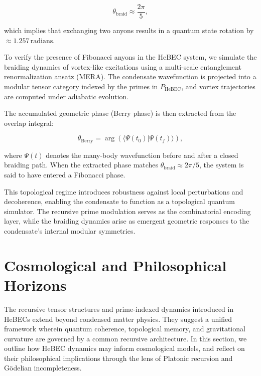 \documentclass{article}
\theoremstyle{plain}
\begin{document}
\begin{equation}
\theta_{\text{braid}} \approx \frac{2\pi}{5},
\end{equation}

which implies that exchanging two anyons results in a quantum state rotation by \( \approx 1.257 \, \text{radians} \).

To verify the presence of Fibonacci anyons in the HeBEC system, we simulate the braiding dynamics of vortex-like excitations using a multi-scale entanglement renormalization ansatz (MERA). The condensate wavefunction is projected into a modular tensor category indexed by the primes in \( P_{\text{HeBEC}} \), and vortex trajectories are computed under adiabatic evolution.

The accumulated geometric phase (Berry phase) is then extracted from the overlap integral:

\begin{equation}
\theta_{\text{Berry}} = \arg\left( \langle \Psi(t_0) | \Psi(t_f) \rangle \right),
\end{equation}

where \( \Psi(t) \) denotes the many-body wavefunction before and after a closed braiding path. When the extracted phase matches \( \theta_{\text{braid}} \approx 2\pi/5 \), the system is said to have entered a Fibonacci phase.

\vspace{0.5em}
This topological regime introduces robustness against local perturbations and decoherence, enabling the condensate to function as a topological quantum simulator. The recursive prime modulation serves as the combinatorial encoding layer, while the braiding dynamics arise as emergent geometric responses to the condensate's internal modular symmetries.

\section{Cosmological and Philosophical Horizons}

The recursive tensor structures and prime-indexed dynamics introduced in HeBECs extend beyond condensed matter physics. They suggest a unified framework wherein quantum coherence, topological memory, and gravitational curvature are governed by a common recursive architecture. In this section, we outline how HeBEC dynamics may inform cosmological models, and reflect on their philosophical implications through the lens of Platonic recursion and Gödelian incompleteness.
\end{document}

